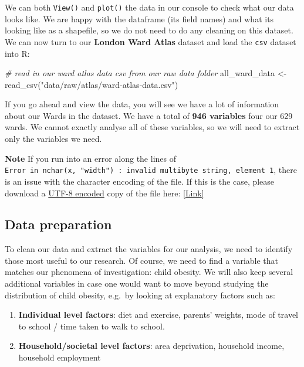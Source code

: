 \documentclass[
]{book}
\newenvironment{Shaded}{\begin{snugshade}}{\end{snugshade}}
\newcommand{\CommentTok}[1]{\textcolor[rgb]{0.56,0.35,0.01}{\textit{#1}}}
\newcommand{\FunctionTok}[1]{\textcolor[rgb]{0.00,0.00,0.00}{#1}}
\newcommand{\NormalTok}[1]{#1}
\newcommand{\OtherTok}[1]{\textcolor[rgb]{0.56,0.35,0.01}{#1}}
\newcommand{\StringTok}[1]{\textcolor[rgb]{0.31,0.60,0.02}{#1}}
\providecommand{\tightlist}{%
  \setlength{\itemsep}{0pt}\setlength{\parskip}{0pt}}
\begin{document}
We can both \texttt{View()} and \texttt{plot()} the data in our console to check what our data looks like. We are happy with the dataframe (its field names) and what its looking like as a shapefile, so we do not need to do any cleaning on this dataset. We can now turn to our \textbf{London Ward Atlas} dataset and load the \texttt{csv} dataset into R:

\begin{Shaded}
\begin{Highlighting}[]
\CommentTok{\# read in our ward atlas data csv from our raw data folder}
\NormalTok{all\_ward\_data }\OtherTok{\textless{}{-}} \FunctionTok{read\_csv}\NormalTok{(}\StringTok{"data/raw/atlas/ward{-}atlas{-}data.csv"}\NormalTok{)}
\end{Highlighting}
\end{Shaded}

If you go ahead and view the data, you will see we have a lot of information about our Wards in the dataset. We have a total of \textbf{946 variables} four our 629 wards. We cannot exactly analyse all of these variables, so we will need to extract only the variables we need.

\textbf{Note}
If you run into an error along the lines of \texttt{Error\ in\ nchar(x,\ "width")\ :\ invalid\ multibyte\ string,\ element\ 1}, there is an issue with the character encoding of the file. If this is the case, please download a \href{https://en.wikipedia.org/wiki/UTF-8\#:~:text=UTF\%2D8\%20is\%20a\%20variable,Transformation\%20Format\%20\%E2\%80\%93\%208\%2Dbit.\&text=Code\%20points\%20with\%20lower\%20numerical,are\%20encoded\%20using\%20fewer\%20bytes.}{UTF-8 encoded} copy of the file here: \href{https://github.com/jtvandijk/GEOG0030/tree/master/data/zip/ward-atlas-data.zip}{{[}Link{]}}

\hypertarget{data-preparation-w07}{%
\subsection{Data preparation}\label{data-preparation-w07}}

To clean our data and extract the variables for our analysis, we need to identify those most useful to our research. Of course, we need to find a variable that matches our phenomena of investigation: child obesity. We will also keep several additional variables in case one would want to move beyond studying the distribution of child obesity, e.g.~by looking at explanatory factors such as:

\begin{enumerate}
\def\labelenumi{\arabic{enumi}.}
\tightlist
\item
  \textbf{Individual level factors}: diet and exercise, parents' weights, mode of travel to school / time taken to walk to school.
\item
  \textbf{Household/societal level factors}: area deprivation, household income, household employment
\end{enumerate}
\end{document}
